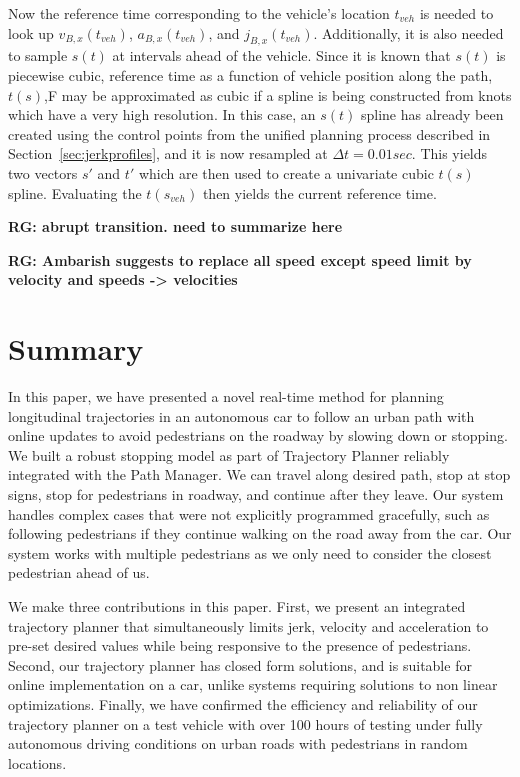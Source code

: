 \documentclass[letterpaper, 10 pt, conference]{ieeeconf}  %
\begin{document}
Now the reference time corresponding to the vehicle's location $t_{veh}$ is needed to look up $v_{B,x}(t_{veh})$, $a_{B,x}(t_{veh})$, and $j_{B,x}(t_{veh})$.
Additionally, it is also needed to sample $s(t)$ at intervals ahead of the vehicle.
Since it is known that $s(t)$ is piecewise cubic, reference time as a function of vehicle position along the path, $t(s)$,F may be approximated as cubic if a spline is being constructed from knots which have a very high resolution.
In this case, an $s(t)$ spline has already been created using the control points from the unified planning process described in Section~\ref{sec:jerkprofiles}, and it is now resampled at $\Delta t = 0.01 sec$.
This yields two vectors $s'$ and $t'$ which are then used to create a univariate cubic $t(s)$ spline.
Evaluating the $t(s_{veh})$ then yields the current reference time.


\textbf{RG: abrupt transition. need to summarize here}

\textbf{RG: Ambarish suggests to replace all speed except speed limit by velocity and speeds -> velocities}

\section{Summary} \label{sec:summary}


In this paper, we have presented a novel real-time method for planning longitudinal trajectories 
in an autonomous car to follow an urban path with online updates to avoid pedestrians on the roadway by slowing down or 
stopping. We built a robust stopping model as part of Trajectory Planner reliably integrated with 
the Path Manager.
We can travel along desired path, stop at stop signs, stop for pedestrians in roadway, and continue after 
they leave. Our system handles complex cases that were not explicitly programmed gracefully, such as following 
pedestrians if they continue walking on the road away from the car. Our system works with multiple 
pedestrians as we only need to consider the closest pedestrian ahead of us. 

We make three contributions in this paper. First, we present an integrated trajectory planner that
simultaneously limits jerk, velocity and acceleration to pre-set desired values while being responsive 
to the presence of pedestrians.
Second, our trajectory planner has closed form solutions, and is suitable for online implementation
on a car, unlike systems requiring solutions to non linear optimizations. Finally, we have confirmed the
efficiency and reliability of our trajectory planner on a test vehicle with over 100 hours of testing
under fully autonomous driving conditions on urban roads with pedestrians in random locations. 
\end{document}
